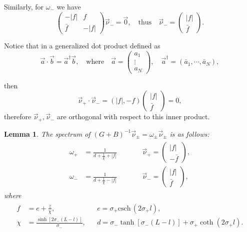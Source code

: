 \documentclass[a4paper,10pt]{article}
\newcommand{\sI}{\ensuremath{\sigma}}
\newcommand{\csch}{\mathrm{csch} \,}
\newtheorem{lemma}{Lemma}
\begin{document}
Similarly, for $\omega_-$ we have
% 
\[
  \begin{pmatrix} -|f|&f\\ \bar{f}&-|f|\end{pmatrix}\vec{\nu}_- = \vec{0},\quad\text{thus}\quad \vec{\nu}_ -= \begin{pmatrix}|f|\\ \bar{f} \end{pmatrix}.
\]
% 

Notice that in a generalized dot product defined as
% 
\[
  \vec{a}\cdot \vec{b} = \vec{a}^\dagger\vec{b},\quad\text{where}\quad\vec{a}=\begin{pmatrix}a_1\\ \vdots \\ a_N\end{pmatrix},\quad\vec{a}^\dagger=(\bar{a}_1, \cdots, \bar{a}_N),
\]
% 

then
% 
\[
  \vec{\nu}_+\cdot \vec{\nu}_- = (|f|,-f)\begin{pmatrix}|f|\\ \bar{f}\end{pmatrix} = 0,
\]
% 
therefore $\vec{\nu}_+,\vec{\nu}_-$ are orthogonal with respect to this inner product.

\begin{lemma}
  The spectrum of $(G+B)^{-1}\vec{\nu}_{\pm} = \omega_{\pm}\vec{\nu}_{\pm}$ is as follows:
% 
\begin{equation}
\label{eqn:spect}
	\begin{split}
	\begin{aligned}
	  \omega_+&=\frac{1}{d+\frac{1}{\chi}+|f|} &&\qquad \vec{\nu}_+=\begin{pmatrix}|f|\\ -\bar{f}\end{pmatrix},\\
	  \omega_-&=\frac{1}{d+\frac{1}{\chi}-|f|} &&\qquad \vec{\nu}_-=\begin{pmatrix}|f|\\ \bar{f}\end{pmatrix},
	\end{aligned}
	\end{split}
\end{equation}
%
where
% 
\begin{equation*}
	\begin{split}
	\begin{aligned}
	  f&=e+\frac{z}{\chi}, &&e = \sI_+\csch(2\sI_+l),\\
	  \chi&=\frac{\sinh[2\sI_-(L-l)]}{\sI_-}, &&d = \sI_-\tanh[\sI_-(L-l)]+\sI_+\coth(2\sI_+l).
	\end{aligned}
	\end{split}
\end{equation*}
%
\end{lemma}
\end{document}
